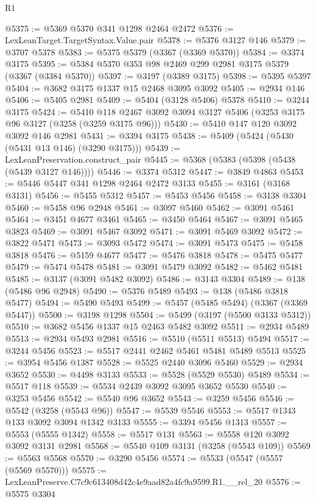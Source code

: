 \begin{lexlean}{R1}
\begin{coremodule}
@5375 := @5369 @5370 @341 @1298 @2464 @2472
@5376 := LexLeanTarget.TargetSyntax.Value.pair
@5378 := @5376 @3127 @146
@5379 := @3707 @5378
@5383 := @5375 @5379 (@3367 (@3369 @5370))
@5384 := @3374 @3175
@5395 := @5384 @5370 @353 @98 @2469 @299 @2981 @3175 @5379 (@3367 (@3384 @5370))
@5397 := @3197 (@3389 @3175)
@5398 := @5395 @5397
@5404 := @3682 @3175 @1337 @15 @2468 @3095 @3092
@5405 := @2934 @146
@5406 := @5405 @2981
@5409 := @5404 (@3128 @5406) @5378
@5410 := @3244 @3175
@5424 := @5410 @118 @2467 @3092 @3094 @3127 @5406 (@3253 @3175 @96 @3127 (@3258 (@3259 @3175 @96)))
@5430 := @5410 @147 @120 @3092 @3092 @146 @2981
@5431 := @3394 @3175
@5438 := @5409 (@5424 (@5430 (@5431 @13 @146) (@3290 @3175)))
@5439 := LexLeanPreservation.construct_pair
@5445 := @5368 (@5383 (@5398 (@5438 (@5439 @3127 @146))))
@5446 := @3374 @5312
@5447 := @3849 @4863
@5453 := @5446 @5447 @341 @1298 @2464 @2472 @3133
@5455 := @3161 (@3168 @3131)
@5456 := @5455 @5312
@5457 := @5453 @5456
@5458 := @3138 @3304
@5460 := @5458 @96 @2948
@5461 := @3097 @5460
@5462 := @3091 @5461
@5464 := @3451 @4677 @3461
@5465 := @3450 @5464
@5467 := @3091 @5465 @3823
@5469 := @3091 @5467 @3092
@5471 := @3091 @5469 @3092
@5472 := @3822 @5471
@5473 := @3093 @5472
@5474 := @3091 @5473
@5475 := @5458 @3818
@5476 := @5159 @4677
@5477 := @5476 @3818
@5478 := @5475 @5477
@5479 := @5474 @5478
@5481 := @3091 @5479 @3092
@5482 := @5462 @5481
@5485 := @3137 (@3091 @5482 @3092)
@5486 := @3143 @3304
@5489 := @138 (@5486 @96 @2948)
@5490 := @5376 @5489
@5493 := @138 (@5486 @3818 @5477)
@5494 := @5490 @5493
@5499 := @5457 (@5485 @5494) (@3367 (@3369 @5447))
@5500 := @3198 @1298
@5504 := @5499 (@3197 (@5500 @3133 @5312))
@5510 := @3682 @5456 @1337 @15 @2463 @5482 @3092
@5511 := @2934 @5489
@5513 := @2934 @5493 @2981
@5516 := @5510 (@5511 @5513) @5494
@5517 := @3244 @5456
@5523 := @5517 @2441 @2462 @5461 @5481 @5489 @5513
@5525 := @3954 @5456 @1387
@5528 := @5525 @2440 @3096 @5460
@5529 := @2934 @3652
@5530 := @4498 @3133
@5533 := @5528 (@5529 @5530) @5489
@5534 := @5517 @118
@5539 := @5534 @2439 @3092 @3095 @3652 @5530
@5540 := @3253 @5456
@5542 := @5540 @96 @3652
@5543 := @3259 @5456
@5546 := @5542 (@3258 (@5543 @96))
@5547 := @5539 @5546
@5553 := @5517 @1343 @133 @3092 @3094 @1342 @3133
@5555 := @3394 @5456 @1313
@5557 := @5553 (@5555 @1342)
@5558 := @5517 @131
@5563 := @5558 @120 @3092 @3092 @3131 @2981
@5568 := @5540 @109 @3131 (@3258 (@5543 @109))
@5569 := @5563 @5568
@5570 := @3290 @5456
@5574 := @5533 (@5547 (@5557 (@5569 @5570)))
@5575 := LexLeanPreserve.C7c9c613408d42c4e9aad82a4fc9a9599.R1.__rel_20
@5576 := @5575 @3304

\end{coremodule}
\end{lexlean}
